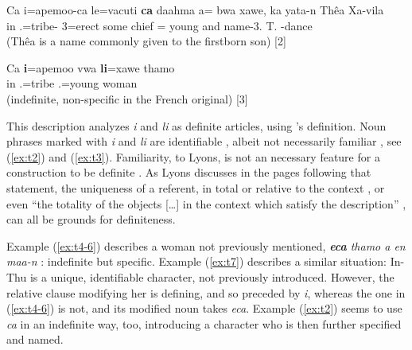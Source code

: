 \ea\label{ex:t2}
\gll 	Ca i=apemoo-ca le=vacuti \textbf{ca} daahma a= bwa xawe, ka yata-n Thêa Xa-vila	\\
	in .=tribe- 3=erect some chief =  young and name-3. T. -dance	\\
\glt  {} (Thêa is a name commonly given to the firstborn son)	{[2]}	
\z

\ea\label{ex:t3}
\gll Ca \textbf{i}=apemoo vwa \textbf{li}=xawe thamo	\\
 in .=tribe  .=young woman	\\
\glt {} (indefinite, non-specific in the French original) {[3]}	
\z

This description analyzes \textit{i}  and \textit{li}  as definite articles, using \textcite{lyons_definiteness_1999}'s definition. Noun phrases marked with \textit{i} and \textit{li} are identifiable \parencite[1]{lyons_definiteness_1999}, albeit not necessarily familiar \parencite[3]{lyons_definiteness_1999}, see (\ref{ex:t2}) and (\ref{ex:t3}). Familiarity, to Lyons, is not an necessary feature for a construction to be definite \parencite[5]{lyons_definiteness_1999}. As Lyons discusses in the pages following that statement, the uniqueness of a referent, in total or relative to the context \parencite[8]{lyons_definiteness_1999}, or even ``the totality of the objects [\ldots] in the context which satisfy the description'' \parencite[11]{lyons_definiteness_1999}, can all be grounds for definiteness. 

Example (\ref{ex:t4-6}) describes a woman not previously mentioned, \textit{\textbf{eca} thamo a en maa-n} : indefinite but specific. Example (\ref{ex:t7}) describes a similar situation: In-Thu is a unique, identifiable character, not previously introduced. However, the relative clause modifying her is defining, and so preceded by \textit{i}, whereas the one in (\ref{ex:t4-6}) is not, and its modified noun takes \textit{eca}. %
Example (\ref{ex:t2}) seems to use \textit{ca} in an indefinite way, too, introducing a character who is then further specified and named. %

